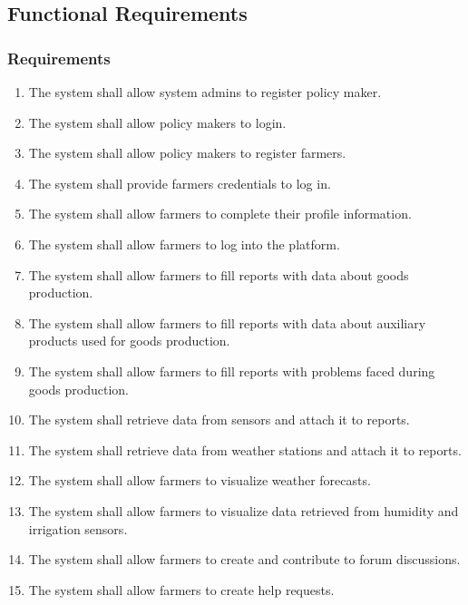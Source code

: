 \documentclass[10pt]{article}
\begin{document}
\subsection{Functional Requirements}
\subsubsection{Requirements}
\begin{enumerate}[label=\textbf{R\arabic*}]
    \item \label{req:pmReg} The system shall allow system admins to register policy maker.    
    \item \label{req:pmLogin} The system shall allow policy makers to login.    
    \item \label{req:farmerReg1} The system shall allow policy makers to register farmers.    
    \item \label{req:farmerCreds} The system shall provide farmers credentials to log in.    
    \item \label{req:farmerReg2} The system shall allow farmers to complete their profile information.    
    \item \label{req:farmerLogin} The system shall allow farmers to log into the platform.      
    \item \label{req:farmerReport1} The system shall allow farmers to fill reports with data about goods production.    
    \item \label{req:farmerReport2} The system shall allow farmers to fill reports with data about auxiliary products used for goods production.    
    \item \label{req:farmerReport3} The system shall allow farmers to fill reports with problems faced during goods production.     
    \item \label{req:farmerReport4} The system shall retrieve data from sensors and attach it to reports.     
    \item \label{req:farmerReport5} The system shall retrieve data from weather stations and attach it to reports.     
    \item \label{req:farmerWeather} The system shall allow farmers to visualize weather forecasts.
    \item \label{req:farmerSensors} The system shall allow farmers to visualize data retrieved from humidity and irrigation sensors.
    \item \label{req:farmerForum} The system shall allow farmers to create and contribute to forum discussions.    
    \item \label{req:farmerHelp} The system shall allow farmers to create help requests.     

\end{enumerate}
\end{document}
